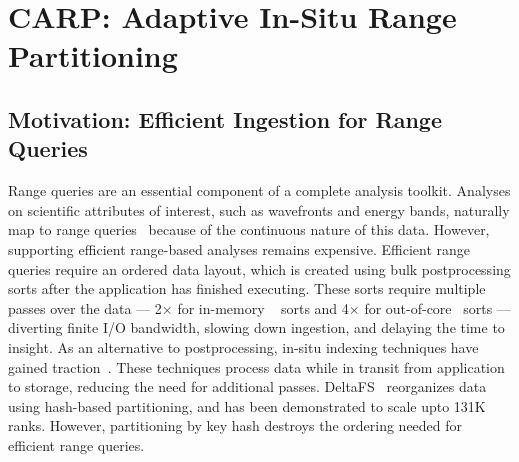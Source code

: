 \chapter{CARP: Adaptive In-Situ Range Partitioning}
\label{chap:carp}

\section{Motivation: Efficient Ingestion for Range Queries}

Range queries are an essential component of a complete analysis toolkit.
Analyses on scientific attributes of interest, such as wavefronts and energy bands, naturally map
to range queries~\cite{Byna2012} because of the continuous nature of this data.
However, supporting efficient range-based analyses remains expensive.
Efficient range queries require an ordered data layout, which is created using bulk postprocessing
sorts after the application has finished executing.
These sorts require multiple passes over the data --- 2$\times$ for in-memory
~\cite{Sunda2013:HykSort,Dong2016} sorts and 4$\times$ for out-of-core~\cite{Rasmu2011:TritonSort}
sorts --- diverting finite I/O bandwidth, slowing down ingestion, and delaying the time to insight.
As an alternative to postprocessing, in-situ indexing techniques have gained
traction~\cite{Bauer2016:SituMethodsInfrastructures}.
These techniques process data while in transit from application to storage, reducing the need for
additional passes.
DeltaFS~\cite{Zheng2018:DeltaFS} reorganizes data using hash-based partitioning, and has been
demonstrated to scale upto 131K ranks.
However, partitioning by key hash destroys the ordering needed for efficient range queries.



